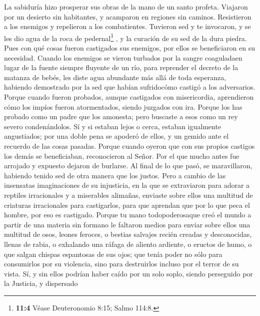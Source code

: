  La sabiduría hizo prosperar sus obras de la mano de un
santo profeta.  Viajaron por un desierto sin habitantes, y
acamparon en regiones sin caminos.  Resistieron a los
enemigos y repelieron a los combatientes.  Tuvieron sed y
te invocaron, y se les dio agua de la roca de pedernal\footnote{\textbf{11:4}
  Véase Deuteronomio 8:15; Salmo 114:8.} , y la curación de su sed de la
dura piedra.  Pues con qué cosas fueron castigados sus
enemigos, por ellos se beneficiaron en su necesidad. 
Cuando los enemigos se vieron turbados por la sangre coaguladaen lugar
de la fuente siempre fluyente de un río,  para reprender
el decreto de la matanza de bebés, les diste agua abundante más allá de
toda esperanza,  habiendo demostrado por la sed que habían
sufridocómo castigó a los adversarios.  Porque cuando
fueron probados, aunque castigados con misericordia, aprendieron cómo
los impíos fueron atormentados, siendo juzgados con ira. 
Porque los has probado como un padre que los amonesta; pero buscaste a
esos como un rey severo condenándolos.  Sí y si estaban
lejos o cerca, estaban igualmente angustiados;  por una
doble pena se apoderó de ellos, y un gemido ante el recuerdo de las
cosas pasadas.  Porque cuando oyeron que con sus propios
castigos los demás se beneficiaban, reconocieron al Señor.
 Por el que mucho antes fue arrojado y expuesto dejaron
de burlarse. Al final de lo que pasó, se maravillaron, habiendo tenido
sed de otra manera que los justos.  Pero a cambio de las
insensatas imaginaciones de su injusticia, en la que se extraviaron para
adorar a reptiles irracionales y a miserables alimañas, enviaste sobre
ellos una multitud de criaturas irracionales para castigarlos,
 para que aprendan que por lo que peca el hombre, por eso
es castigado.  Porque tu mano todopoderosaque creó el
mundo a partir de una materia sin formano le faltaron medios para enviar
sobre ellos una multitud de osos, leones feroces,  o
bestias salvajes recién creadas y desconocidas, llenas de rabia, o
exhalando una ráfaga de aliento ardiente, o eructos de humo, o que
salgan chispas espantosas de sus ojos;  que tenía poder
no sólo para consumirlos por su violencia, sino para destruirlos incluso
por el terror de su vista.  Sí, y sin ellos podrían haber
caído por un solo soplo, siendo perseguido por la Justicia, y dispersado
